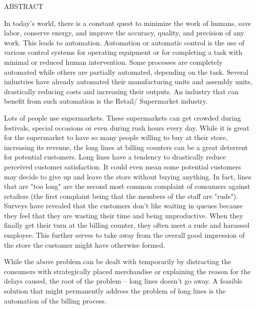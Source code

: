{\fontsize{16pt}{19.2pt}\selectfont\bf{\begin{center}
ABSTRACT
\end{center}}}

\vspace*{1cm}

In today’s world, there is a constant quest to minimize the work of humans, save labor, conserve energy, and improve the accuracy, quality, and precision of any work. This leads to automation. Automation or automatic control is the use of various control systems for operating equipment or for completing a task with minimal or reduced human intervention. Some processes are completely automated while others are partially automated, depending on the task. Several industries have already automated their manufacturing units and assembly units, drastically reducing costs and increasing their outputs. An industry that can benefit from such automation is the Retail/ Supermarket industry.


Lots of people use supermarkets. These supermarkets can get crowded during festivals, special occasions or even during rush hours every day. While it is great for the supermarket to have so many people willing to buy at their store, increasing its revenue, the long lines at billing counters can be a great deterrent for potential customers. Long lines have a tendency to drastically reduce perceived customer satisfaction. It could even mean some potential customers may decide to give up and leave the store without buying anything. In fact, lines that are "too long" are the second most common complaint of consumers against retailers (the first complaint being that the members of the staff are "rude"). Surveys have revealed that the customers don’t like waiting in queues because they feel that they are wasting their time and being unproductive. When they finally get their turn at the billing counter, they often meet a rude and harassed employee. This further serves to take away from the overall good impression of the store the customer might have otherwise formed.


While the above problem can be dealt with temporarily by distracting the consumers with strategically placed merchandise or explaining the reason for the delays caused, the root of the problem – long lines doesn’t go away. A feasible solution that might permanently address the problem of long lines is the automation of the billing process.